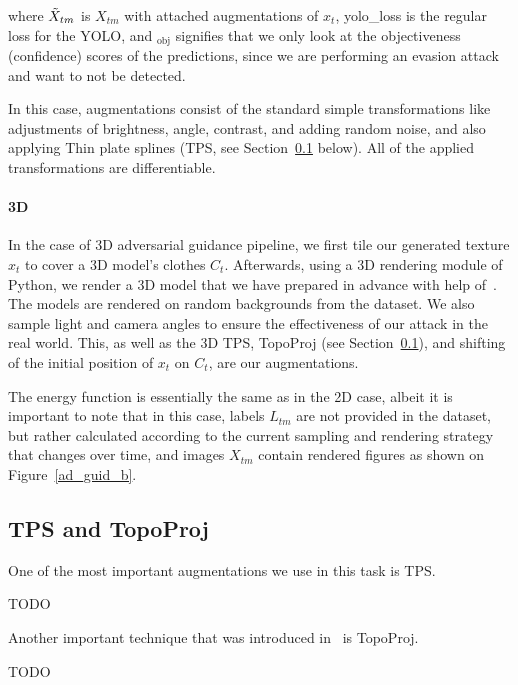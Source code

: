 where $\Tilde{X}_{tm}$ is $X_{tm}$ with attached augmentations of $x_t$, yolo\_loss is the regular loss for the YOLO, and $_{\text{obj}}$ signifies that we only look at the objectiveness (confidence) scores of the predictions, since we are performing an evasion attack and want to not be detected. 

In this case, augmentations consist of the standard simple transformations like adjustments of brightness, angle, contrast, and adding random noise, and also applying Thin plate splines (TPS, see Section~\ref{sec:tps} below).
All of the applied transformations are differentiable. 

\paragraph{3D} 
In the case of 3D adversarial guidance pipeline, we first tile our generated texture $x_t$ to cover a 3D model's clothes $C_t$.
Afterwards, using a 3D rendering module of Python, we render a 3D model that we have prepared in advance with help of~\cite{zh_3d}.
The models are rendered on random backgrounds from the dataset.
We also sample light and camera angles to ensure the effectiveness of our attack in the real world. 
This, as well as the 3D TPS, TopoProj (see Section~\ref{sec:tps}),  and shifting of the initial position of $x_t$ on $C_t$, are our augmentations.

The energy function is essentially the same as in the 2D case, albeit it is important to note that in this case, labels $L_{tm}$ are not provided in the dataset, but rather calculated according to the current sampling and rendering strategy that changes over time, and images $X_{tm}$ contain rendered figures as shown on Figure~\ref{ad_guid_b}.

\subsection{TPS and TopoProj}\label{sec:tps}

One of the most important augmentations we use in this task is TPS. 

 TODO 

Another important technique that was introduced in~\cite{zh_3d} is TopoProj.

 TODO 


